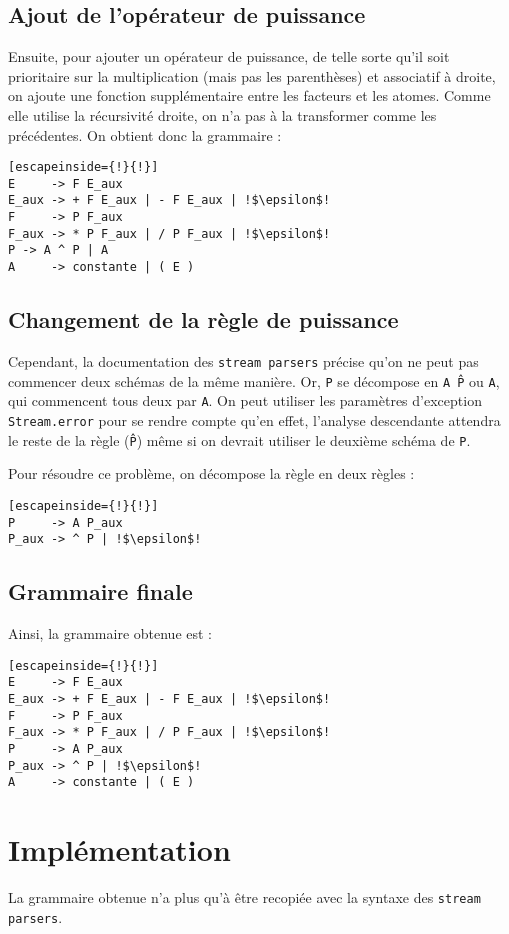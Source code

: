 \documentclass[11pt]{article}
\begin{document}
\subsection{Ajout de l'opérateur de puissance}
Ensuite, pour ajouter un opérateur de puissance, de telle sorte qu'il soit prioritaire sur la multiplication (mais pas les parenthèses) et associatif à droite, on ajoute une fonction supplémentaire entre les facteurs et les atomes. Comme elle utilise la récursivité droite, on n'a pas à la transformer comme les précédentes. On obtient donc la grammaire : 
\begin{lstlisting}[escapeinside={!}{!}]
E     -> F E_aux
E_aux -> + F E_aux | - F E_aux | !$\epsilon$!
F     -> P F_aux
F_aux -> * P F_aux | / P F_aux | !$\epsilon$!
P -> A ^ P | A
A     -> constante | ( E )
\end{lstlisting}

\subsection{Changement de la règle de puissance}
Cependant, la documentation des \texttt{stream parsers} précise qu'on ne peut pas commencer deux schémas de la même manière. Or, \texttt{P} se décompose en \texttt{A \^ P} ou \texttt{A}, qui commencent tous deux par \texttt{A}. On peut utiliser les paramètres d'exception \texttt{Stream.error} pour se rendre compte qu'en effet, l'analyse descendante attendra le reste de la règle (\texttt{\^ P}) même si on devrait utiliser le deuxième schéma de \texttt{P}.

Pour résoudre ce problème, on décompose la règle en deux règles :
\begin{lstlisting}[escapeinside={!}{!}]
P     -> A P_aux
P_aux -> ^ P | !$\epsilon$!
\end{lstlisting}

\subsection{Grammaire finale}
Ainsi, la grammaire obtenue est :
\begin{lstlisting}[escapeinside={!}{!}]
E     -> F E_aux
E_aux -> + F E_aux | - F E_aux | !$\epsilon$!
F     -> P F_aux
F_aux -> * P F_aux | / P F_aux | !$\epsilon$!
P     -> A P_aux
P_aux -> ^ P | !$\epsilon$!
A     -> constante | ( E )
\end{lstlisting}
 

\section{Implémentation}
La grammaire obtenue n'a plus qu'à être recopiée avec la syntaxe des \texttt{stream parsers}. 
\end{document}
